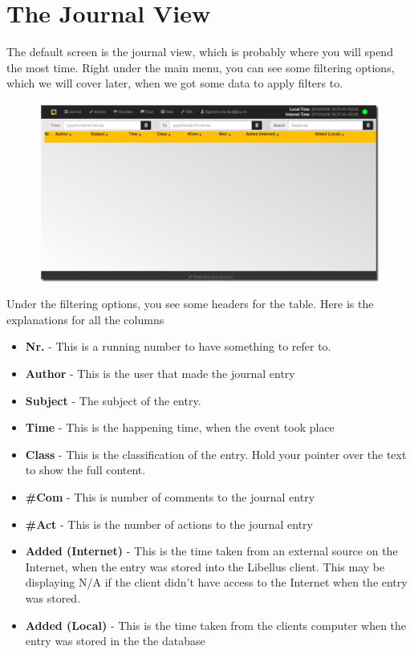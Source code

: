 \documentclass[letterpaper,10pt,english]{sphinxmanual}
\begin{document}
\section{The Journal View}
\label{User manual:the-journal-view}
The default screen is the journal view, which is probably where you will spend the most time.
Right under the main menu, you can see some filtering options, which we will cover later, when we got some data to apply filters to.
\begin{figure}[htbp]
\centering

\includegraphics{journal8.png}
\end{figure}

Under the filtering options, you see some headers for the table. Here is the explanations for all the columns
\begin{itemize}
\item {} 
\textbf{Nr.} - This is a running number to have something to refer to.

\item {} 
\textbf{Author} - This is the user that made the journal entry

\item {} 
\textbf{Subject} - The subject of the entry.

\item {} 
\textbf{Time} - This is the happening time, when the event took place

\item {} 
\textbf{Class} - This is the classification of the entry. Hold your pointer over the text to show the full content.

\item {} 
\textbf{\#Com} - This is number of comments to the journal entry

\item {} 
\textbf{\#Act} - This is the number of actions to the journal entry

\item {} 
\textbf{Added (Internet)} - This is the time taken from an external source on the Internet, when the entry was stored into the Libellus client. This may be displaying N/A if the client didn’t have access to the Internet when the entry was stored.

\item {} 
\textbf{Added (Local)} - This is the time taken from the clients computer when the entry was stored in the the database

\end{itemize}
\end{document}
